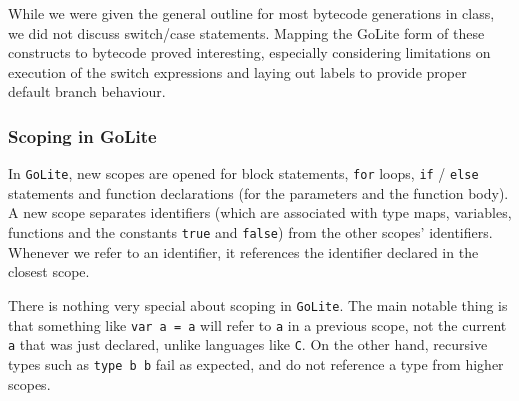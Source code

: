 \documentclass[11pt]{article}
\begin{document}
While we were given the general outline for most bytecode generations in class, we
did not discuss switch/case statements. Mapping the GoLite form of these constructs
to bytecode proved interesting, especially considering limitations on execution of
the switch expressions and laying out labels to provide proper default branch behaviour.

\subsubsection{Scoping in GoLite}
In \texttt{GoLite}, new scopes are opened for block statements,
\texttt{for} loops, \texttt{if} / \texttt{else} statements and
function declarations (for the parameters and the function body). A
new scope separates identifiers (which are associated with type maps,
variables, functions and the constants \texttt{true} and
\texttt{false}) from the other scopes' identifiers. Whenever we refer
to an identifier, it references the identifier declared in the closest
scope.

There is nothing very special about scoping in \texttt{GoLite}. The
main notable thing is that something like \texttt{var a = a} will
refer to \texttt{a} in a previous scope, not the current \texttt{a}
that was just declared, unlike languages like \texttt{C}.  On the
other hand, recursive types such as \texttt{type b b} fail as
expected, and do not reference a type from higher scopes.
\end{document}
